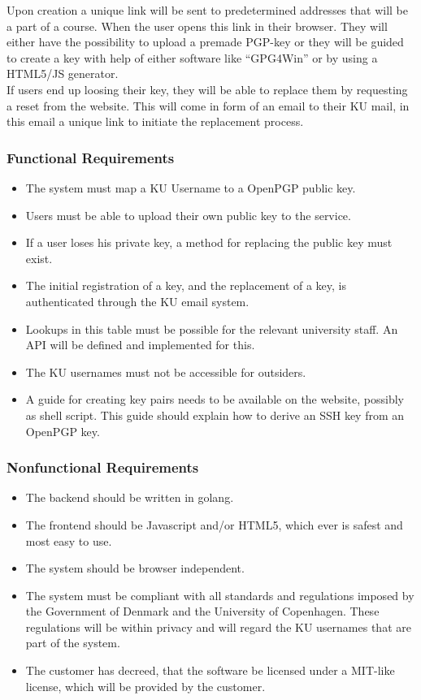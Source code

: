 \documentclass[11pt,a4paper]{article}
\begin{document}
Upon creation a unique link will be sent to predetermined addresses that will be a part of a course. When the user opens this link in their browser. They will either have the possibility to upload a premade PGP-key or they will be guided to create a key with help of either software like “GPG4Win” or by using a HTML5/JS generator. \\

If users end up loosing their key, they will be able to replace them by requesting a reset from the website. This will come in form of an email to their KU mail, in this email a unique link to initiate the replacement process.\\



\subsubsection{Functional Requirements}
\begin{itemize}
\item The system must map a KU Username to a OpenPGP public key.
\item Users must be able to upload their own public key to the service.
\item If a user loses his private key, a method for replacing the public key must exist.
\item The initial registration of a key, and the replacement of a key, is authenticated through the KU email system.
\item Lookups in this table must be possible for the relevant university staff. An API will be defined and implemented for this.
\item The KU usernames must not be accessible for outsiders.
\item A guide for creating key pairs needs to be available on the website, possibly as shell script. This guide should explain how to derive an SSH key from an OpenPGP key.
\end{itemize}
\subsubsection{Nonfunctional Requirements}
\begin{itemize}
\item The backend should be written in golang.
\item The frontend should be Javascript and/or HTML5, which ever is safest and most easy to use.
\item The system should be browser independent.
\item The system must be compliant with all standards and regulations imposed by the Government of Denmark and the University of Copenhagen. These regulations will be within privacy and will regard the KU usernames that are part of the system.
\item The customer has decreed, that the software be licensed under a MIT-like license, which will be provided by the customer.
\end{itemize}
\end{document}
